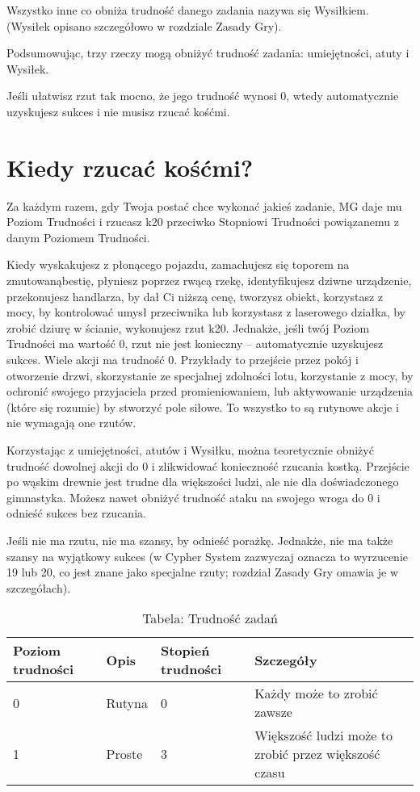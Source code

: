 Wszystko inne co obniża trudność danego zadania nazywa się Wysiłkiem. (Wysiłek opisano szczegółowo w rozdziale Zasady Gry).

Podsumowując, trzy rzeczy mogą obniżyć trudność zadania: umiejętności, atuty i Wysiłek. 

Jeśli ułatwisz rzut tak mocno, że jego trudność wynosi 0, wtedy automatycznie uzyskujesz sukces i nie musisz rzucać kośćmi. 

\section {Kiedy rzucać kośćmi?}

Za każdym razem, gdy Twoja postać chce wykonać jakieś zadanie, MG daje mu Poziom Trudności i rzucasz k20 przeciwko Stopniowi Trudności powiązanemu z danym Poziomem Trudności.

Kiedy wyskakujesz z płonącego pojazdu, zamachujesz się toporem na zmutowanąbestię, płyniesz poprzez rwącą rzekę, identyfikujesz dziwne urządzenie, przekonujesz handlarza, by dał Ci niższą cenę, tworzysz obiekt, korzystasz z mocy, by kontrolować umysł przeciwnika lub korzystasz z laserowego działka, by zrobić dziurę w ścianie, wykonujesz rzut k20.
Jednakże, jeśli twój Poziom Trudności ma wartość 0, rzut nie jest konieczny – automatycznie uzyskujesz sukces. Wiele akcji ma trudność 0. Przykłady to przejście przez pokój i otworzenie drzwi, skorzystanie ze specjalnej zdolności lotu, korzystanie z mocy, by ochronić swojego przyjaciela przed promieniowaniem, lub aktywowanie urządzenia (które się rozumie) by stworzyć pole siłowe. To wszystko to są rutynowe akcje i nie wymagają one rzutów.

Korzystając z umiejętności, atutów i Wysiłku, można teoretycznie obniżyć trudność dowolnej akcji do 0 i zlikwidować konieczność rzucania kostką. Przejście po wąskim drewnie jest trudne dla większości ludzi, ale nie dla doświadczonego gimnastyka. Możesz nawet obniżyć trudność ataku na swojego wroga do 0 i odnieść sukces bez rzucania.

Jeśli nie ma rzutu, nie ma szansy, by odnieść porażkę. Jednakże, nie ma także szansy na wyjątkowy sukces (w Cypher System zazwyczaj oznacza to wyrzucenie 19 lub 20, co jest znane jako specjalne rzuty; rozdział Zasady Gry omawia je w szczegółach).

\begin{table*}[t]
 \centering
 \begin{tabularx}{\textwidth}{ | X | X | X | X |}
  \hline
   Poziom trudności & Opis & Stopień trudności & Szczegóły  \\ \hline
    0 & Rutyna & 0 & Każdy może to zrobić zawsze \\ \hline
    1 & Proste & 3 & Większość ludzi może to zrobić przez większość czasu  \\ \hline
 \end{tabularx}
  \caption {Tabela: Trudność zadań}
  \label {Tabela: Trudność zadań}
 \end{table*}
 
